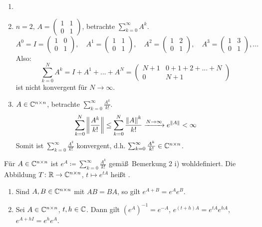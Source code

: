 \begin{beispiel}
	\begin{enumerate}
		\item[]
		\item $ n=2 $, $ A=\begin{pmatrix}
		1&1\\0&1
		\end{pmatrix} $, betrachte $ \sum_{k=0}^{\infty}A^k $.
		\[ A^0=I=\begin{pmatrix}
		1&0\\0&1
		\end{pmatrix},\quad A^1=\begin{pmatrix}
		1&1\\0&1
		\end{pmatrix},\quad A^2=\begin{pmatrix}
		1&2\\0&1
		\end{pmatrix},\quad A^3=\begin{pmatrix}
		1&3\\0&1
		\end{pmatrix},... \]
		Also:
		\[ \sum_{k=0}^{N}A^k=I+A^1+...+A^N=\begin{pmatrix}
		N+1&0+1+2+...+N\\
		0&N+1
		\end{pmatrix} \]
		ist nicht konvergent f\"ur $ N\to\infty $.
		\item $ A\in\mathbb{C}^{n\times n} $, betrachte $ \sum_{k=0}^{\infty}\frac{A^k}{k!} $.
		\[ \sum_{k=0}^{N}\left\|\frac{A^k}{k!}\right\|\leq\sum_{k=0}^{N}\frac{\left\|A\right\|^k}{k!}\xrightarrow{N\to\infty}e^{\left\|A\right\|}<\infty \]
		Somit ist $ \sum_{k=0}^{\infty}\frac{A^k}{k!} $ konvergent, d.h. $ \sum_{k=0}^{\infty}\frac{A^k}{k!}\in\mathbb{C}^{n\times n} $.
	\end{enumerate}
\end{beispiel}
\begin{definition}
	F\"ur $ A\in\mathbb{C}^{n\times n} $ ist $ e^A\coloneqq\sum_{k=0}^{\infty}\frac{A^k}{k!} $ gem\"a\ss\ Bemerkung 2 i) wohldefiniert. Die Abbildung $ T\colon\mathbb{R}\rightarrow\mathbb{C}^{n\times n} $, $ t\mapsto e^{tA} $ hei\ss t .
\end{definition}
\begin{lemma}
	\bullshit
	\begin{enumerate}
		\item Sind $ A,B\in\mathbb{C}^{n\times n} $ mit $ AB=BA $, so gilt $ e^{A+B}=e^Ae^B $.
		\item Sei $ A\in\mathbb{C}^{n\times n} $, $ t,h\in\mathbb{C} $. Dann gilt $ (e^A)^{-1}=e^{-A} $, $ e^{(t+h)A}=e^{tA}e^{hA} $, $ e^{A+hI}=e^he^A $.
	\end{enumerate}
\end{lemma}
